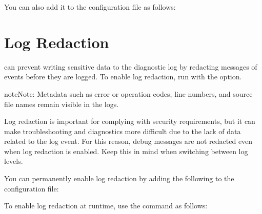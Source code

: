 \documentclass[letterpaper,10pt,english]{sphinxmanual}
\begin{document}
\sphinxAtStartPar
You can also add it to the configuration file as follows:

\begin{sphinxVerbatim}[commandchars=\\\{\}]
   
\end{sphinxVerbatim}


\chapter{Log Redaction}
\label{\detokenize{log-redaction:log-redaction}}\label{\detokenize{log-redaction:id1}}\label{\detokenize{log-redaction::doc}}
\sphinxAtStartPar
{} can prevent writing sensitive data to the diagnostic log
by redacting messages of events before they are logged.
To enable log redaction,
run  with the  option.

\begin{sphinxadmonition}{note}{Note:}
\sphinxAtStartPar
Metadata such as error or operation codes, line numbers,
and source file names remain visible in the logs.
\end{sphinxadmonition}

\sphinxAtStartPar
Log redaction is important for complying with security requirements,
but it can make troubleshooting and diagnostics more difficult
due to the lack of data related to the log event.
For this reason, debug messages are not redacted
even when log redaction is enabled.
Keep this in mind when switching between log levels.

\sphinxAtStartPar
You can permanently enable log redaction
by adding the following to the configuration file:

\begin{sphinxVerbatim}[commandchars=\\\{\}]
   
\end{sphinxVerbatim}

\sphinxAtStartPar
To enable log redaction at runtime,
use the  command as follows:

\begin{sphinxVerbatim}[commandchars=\\\{\}]
        
\end{sphinxVerbatim}
\end{document}
